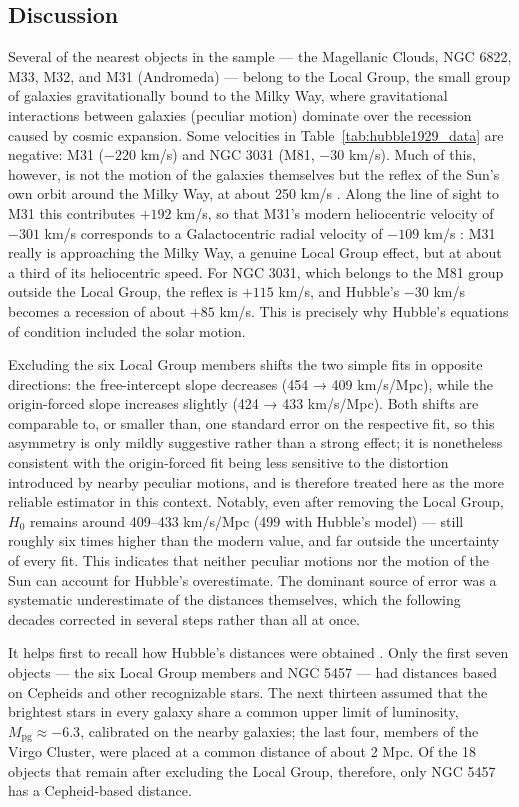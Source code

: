 \documentclass[11pt]{article}
\begin{document}
\subsection{Discussion}
Several of the nearest objects in the sample --- the Magellanic Clouds, NGC 6822, M33, M32, and M31 (Andromeda) --- belong to the Local Group, the small group of galaxies gravitationally bound to the Milky Way, where gravitational interactions between galaxies (peculiar motion) dominate over the recession caused by cosmic expansion. Some velocities in Table~\ref{tab:hubble1929_data} are negative: M31 ($-220$ km/s) and NGC 3031 (M81, $-30$ km/s). Much of this, however, is not the motion of the galaxies themselves but the reflex of the Sun's own orbit around the Milky Way, at about 250 km/s \citep{schonrich2010, mcmillan2011}. Along the line of sight to M31 this contributes $+192$ km/s, so that M31's modern heliocentric velocity of $-301$ km/s corresponds to a Galactocentric radial velocity of $-109$ km/s \citep{vandermarel2012}: M31 really is approaching the Milky Way, a genuine Local Group effect, but at about a third of its heliocentric speed. For NGC 3031, which belongs to the M81 group outside the Local Group, the reflex is $+115$ km/s, and Hubble's $-30$ km/s becomes a recession of about $+85$ km/s. This is precisely why Hubble's equations of condition included the solar motion.

Excluding the six Local Group members shifts the two simple fits in opposite directions: the free-intercept slope decreases (454 → 409 km/s/Mpc), while the origin-forced slope increases slightly (424 → 433 km/s/Mpc). Both shifts are comparable to, or smaller than, one standard error on the respective fit, so this asymmetry is only mildly suggestive rather than a strong effect; it is nonetheless consistent with the origin-forced fit being less sensitive to the distortion introduced by nearby peculiar motions, and is therefore treated here as the more reliable estimator in this context.
Notably, even after removing the Local Group, $H_0$ remains around 409--433 km/s/Mpc (499 with Hubble's model) --- still roughly six times higher than the modern value, and far outside the uncertainty of every fit. This indicates that neither peculiar motions nor the motion of the Sun can account for Hubble's overestimate. The dominant source of error was a systematic underestimate of the distances themselves, which the following decades corrected in several steps rather than all at once.

It helps first to recall how Hubble's distances were obtained \citep{hubble1929}. Only the first seven objects --- the six Local Group members and NGC 5457 --- had distances based on Cepheids and other recognizable stars. The next thirteen assumed that the brightest stars in every galaxy share a common upper limit of luminosity, $M_{\text{pg}} \approx -6.3$, calibrated on the nearby galaxies; the last four, members of the Virgo Cluster, were placed at a common distance of about 2 Mpc. Of the 18 objects that remain after excluding the Local Group, therefore, only NGC 5457 has a Cepheid-based distance.
\end{document}
